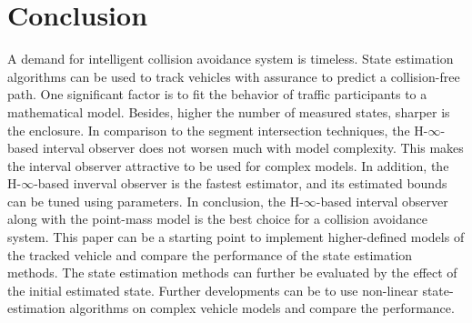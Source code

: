 \chapter{Conclusion} \label{ch:conclusion}
A demand for intelligent collision avoidance system is timeless. State estimation algorithms can be used to track vehicles with assurance to predict a collision-free path. One significant factor is to fit the behavior of traffic participants to a mathematical model. Besides, higher the number of measured states, sharper is the enclosure. In comparison to the segment intersection techniques, the H-$\infty$-based interval observer does not worsen much with model complexity. This makes the interval observer attractive to be used for complex models. In addition, the H-$\infty$-based inverval observer is the fastest estimator, and its estimated bounds can be tuned using parameters. In conclusion, the H-$\infty$-based interval observer along with the point-mass model is the best choice for a collision avoidance system. This paper can be a starting point to implement higher-defined models of the tracked vehicle and compare the performance of the state estimation methods. The state estimation methods can further be evaluated by the effect of the initial estimated state. Further developments can be to use non-linear state-estimation algorithms on complex vehicle models and compare the performance.